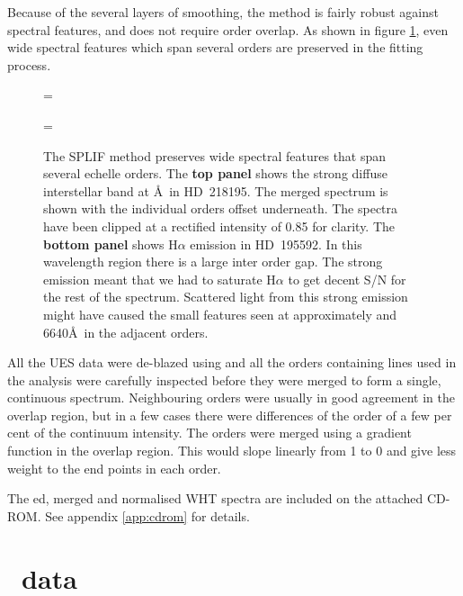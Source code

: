 Because of the several layers of smoothing, the method is fairly
robust against spectral features, and does not require order overlap.
As shown in figure \ref{fig:splif_wide}, even wide spectral features which
span several orders are preserved in the fitting process.

\begin{figure} %
\epsfxsize=\figwidth
\setlength{\cen}{(\textwidth / 2) - (\epsfxsize / 2)}
\hspace{\cen}

\epsfxsize=\figwidth
\setlength{\cen}{(\textwidth / 2) - (\epsfxsize / 2)}
\hspace{\cen}

\caption[Wide spectral features preserved by SPLIFing]{\fcfont The SPLIF method
preserves wide spectral features that span several echelle orders. The
\textbf{top panel} shows the strong diffuse interstellar band at \AA\ in HD~218195.  The merged spectrum is shown with the
individual orders offset underneath. The spectra have been clipped at
a rectified intensity of 0.85 for clarity.  The \textbf{bottom panel}
shows H$\alpha$ emission in HD~195592. In this wavelength region there
is a large inter order gap. The strong emission meant that we had to
saturate H$\alpha$ to get decent S/N for the rest of the
spectrum. Scattered light from this strong emission might have caused
the small features seen at approximately \lam{} and 6640\AA\ in
the adjacent orders.}
\label{fig:splif_wide}
\end{figure}

All the UES data were de-blazed using  and all the orders
containing lines used in the analysis were carefully inspected
before they were merged to form a single, continuous
spectrum. Neighbouring orders were usually in good agreement in the
overlap region, but in a few cases there were differences of the order
of a few per cent of the continuum intensity. The orders were merged
using a gradient function in the overlap region. This would slope
linearly from 1 to 0 and give less weight to the end points in each
order.

The ed, merged and normalised WHT spectra are included on
the attached CD-ROM. See appendix \ref{app:cdrom} for details.

\section{\iue\ data}

